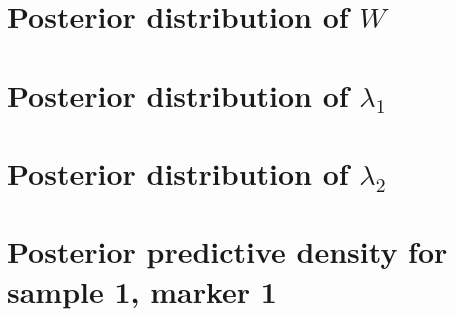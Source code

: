 \documentclass[10pt]{article} %
\begin{document}
\newpage
\section{Posterior distribution of $W$}
\begin{figure}[H]
  \begin{center}  %
  \end{center}
\end{figure}


\newpage
\section{Posterior distribution of $\lambda_1$}
\begin{figure}[H]
  \begin{center}  %
  \end{center}
\end{figure}

\newpage
\section{Posterior distribution of $\lambda_2$}
\begin{figure}[H]
  \begin{center}  %
  \end{center}
\end{figure}

\newpage
\section{Posterior predictive density for sample 1, marker 1}
\begin{figure}[H]
  \begin{center}  %
  \end{center}
\end{figure}
\end{document}
